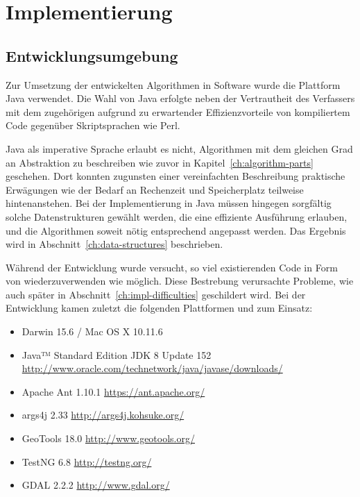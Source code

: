 \documentclass[../main/thesis.tex]{subfiles}
\begin{document}
\chapter{Implementierung}

\section{Entwicklungsumgebung}

Zur Umsetzung der entwickelten Algorithmen in Software wurde die Plattform Java verwendet.
Die Wahl von Java erfolgte neben der Vertrautheit des Verfassers mit dem zugehörigen  aufgrund zu erwartender Effizienzvorteile von kompiliertem Code gegenüber Skriptsprachen wie Perl.

Java als imperative Sprache erlaubt es nicht, Algorithmen mit dem gleichen Grad an Abstraktion zu beschreiben wie zuvor in Kapitel~\ref{ch:algorithm-parts} geschehen.
Dort konnten zugunsten einer vereinfachten
Beschreibung praktische Erwägungen wie der Bedarf an Rechenzeit und Speicherplatz teilweise hintenanstehen.
Bei der Implementierung in Java müssen hingegen sorgfältig solche Datenstrukturen gewählt werden, die eine effiziente Ausführung erlauben, und die Algorithmen soweit nötig entsprechend angepasst werden.
Das Ergebnis wird in Abschnitt~\ref{ch:data-structures} beschrieben.

Während der Entwicklung wurde versucht, so viel existierenden Code in Form von  wiederzuverwenden wie möglich.
Diese Bestrebung verursachte Probleme, wie auch später in Abschnitt~\ref{ch:impl-difficulties} geschildert wird.
Bei der Entwicklung kamen zuletzt die folgenden Plattformen und  zum Einsatz:

\begin{itemize}[nosep]
	\item Darwin 15.6 / Mac OS X 10.11.6
	\item Java™ Standard Edition JDK 8 Update 152\\ \url{http://www.oracle.com/technetwork/java/javase/downloads/}
	\item Apache Ant 1.10.1 \quad \url{https://ant.apache.org/}
	\item args4j 2.33 \quad \url{http://args4j.kohsuke.org/}
	\item GeoTools 18.0 \quad \url{http://www.geotools.org/}
	\item TestNG 6.8 \quad \url{http://testng.org/}
	\item GDAL 2.2.2 \quad \url{http://www.gdal.org/}
\end{itemize}
\end{document}
